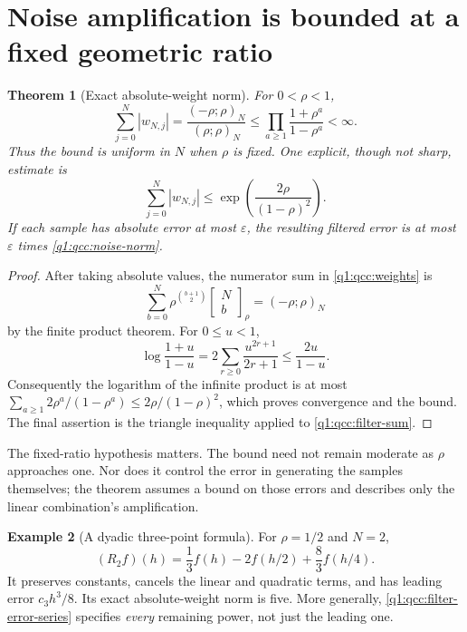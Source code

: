 \documentclass[11pt,a4paper,oneside,openany]{book}
\newtheorem{theorem}{Theorem}[chapter]
\theoremstyle{definition}
\newtheorem{example}[theorem]{Example}
\theoremstyle{remark}
\newcommand{\GB}[3][q]{\begin{bmatrix}#2\\#3\end{bmatrix}_{#1}}
\begin{document}
\section{Noise amplification is bounded at a fixed geometric ratio}
\begin{theorem}[Exact absolute-weight norm]\label{q1:qcc:filter-noise}
For \(0<\rho<1\),
\begin{equation}\label{q1:qcc:noise-norm}
 \sum_{j=0}^{N}|w_{N,j}|
       =\frac{(-\rho;\rho)_N}{(\rho;\rho)_N}
       \le\prod_{a\ge1}\frac{1+\rho^a}{1-\rho^a}<\infty.
\end{equation}
Thus the bound is uniform in \(N\) when \(\rho\) is fixed. One explicit,
though not sharp, estimate is
\begin{equation}\label{q1:qcc:noise-simple-bound}
 \sum_{j=0}^{N}|w_{N,j}|
       \le\exp\left(\frac{2\rho}{(1-\rho)^2}\right).
\end{equation}
If each sample has absolute error at most \(\varepsilon\), the resulting
filtered error is at most \(\varepsilon\) times
\eqref{q1:qcc:noise-norm}.
\end{theorem}
\begin{proof}
After taking absolute values, the numerator sum in \eqref{q1:qcc:weights} is
\[
 \sum_{b=0}^{N}\rho^{\binom{b+1}{2}}\GB[\rho]Nb
       =(-\rho;\rho)_N
\]
by the finite product theorem. For \(0\le u<1\),
\[
 \log\frac{1+u}{1-u}
 =2\sum_{r\ge0}\frac{u^{2r+1}}{2r+1}
 \le\frac{2u}{1-u}.
\]
Consequently the logarithm of the infinite product is at most
\(\sum_{a\ge1}2\rho^a/(1-\rho^a)
 \le2\rho/(1-\rho)^2\), which proves convergence and the bound.
The final assertion is the triangle inequality applied to
\eqref{q1:qcc:filter-sum}.
\end{proof}

The fixed-ratio hypothesis matters. The bound need not remain moderate as
\(\rho\) approaches one. Nor does it control the error in generating the
samples themselves; the theorem assumes a bound on those errors and describes
only the linear combination's amplification.

\begin{example}[A dyadic three-point formula]
For \(\rho=1/2\) and \(N=2\),
\begin{equation}\label{q1:qcc:dyadic-filter}
 (R_2f)(h)=\frac13 f(h)-2f(h/2)+\frac83f(h/4).
\end{equation}
It preserves constants, cancels the linear and quadratic terms, and has leading
error \(c_3h^3/8\). Its exact absolute-weight norm is five. More generally,
\eqref{q1:qcc:filter-error-series} specifies \emph{every} remaining power,
not just the leading one.
\end{example}
\end{document}
